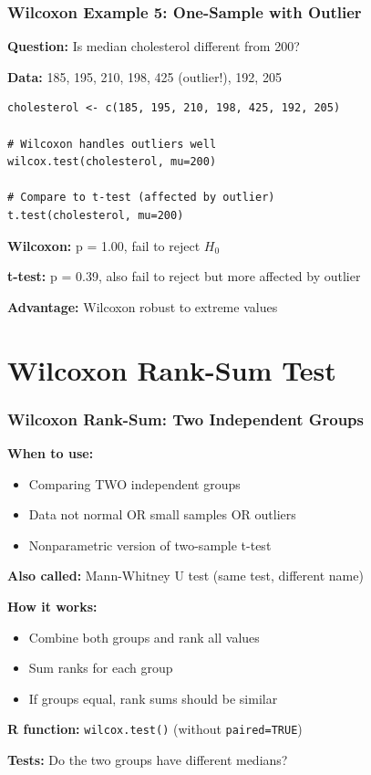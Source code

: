 \documentclass{beamer}
\begin{document}
\begin{frame}[fragile]
\frametitle{Wilcoxon Example 5: One-Sample with Outlier}
\textbf{Question:} Is median cholesterol different from 200?

\vspace{0.3cm}
\textbf{Data:} 185, 195, 210, 198, 425 (outlier!), 192, 205

\vspace{0.3cm}
\begin{small}
\begin{verbatim}
cholesterol <- c(185, 195, 210, 198, 425, 192, 205)

# Wilcoxon handles outliers well
wilcox.test(cholesterol, mu=200)

# Compare to t-test (affected by outlier)
t.test(cholesterol, mu=200)
\end{verbatim}
\end{small}

\textbf{Wilcoxon:} p = 1.00, fail to reject $H_0$

\textbf{t-test:} p = 0.39, also fail to reject but more affected by outlier

\textbf{Advantage:} Wilcoxon robust to extreme values
\end{frame}

\section{Wilcoxon Rank-Sum Test}

\begin{frame}
\frametitle{Wilcoxon Rank-Sum: Two Independent Groups}
\textbf{When to use:}
\begin{itemize}
\item Comparing TWO independent groups
\item Data not normal OR small samples OR outliers
\item Nonparametric version of two-sample t-test
\end{itemize}

\vspace{0.5cm}
\textbf{Also called:} Mann-Whitney U test (same test, different name)

\vspace{0.5cm}
\textbf{How it works:}
\begin{itemize}
\item Combine both groups and rank all values
\item Sum ranks for each group
\item If groups equal, rank sums should be similar
\end{itemize}

\vspace{0.5cm}
\textbf{R function:} \texttt{wilcox.test()} (without \texttt{paired=TRUE})

\textbf{Tests:} Do the two groups have different medians?
\end{frame}
\end{document}

